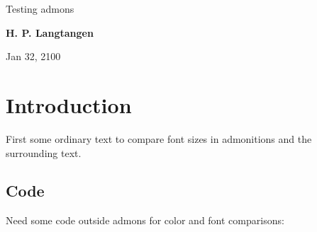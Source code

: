 \documentclass[%
oneside,                 %
final,                   %
10pt]{article}
\begin{document}

\newcommand{\exercisesection}[1]{\subsection*{#1}}








\thispagestyle{empty}

\begin{center}
{\LARGE\bf
\begin{spacing}{1.25}
Testing admons
\end{spacing}
}
\end{center}


\begin{center}
{\bf H. P. Langtangen${}^{}$} \\ [0mm]
\end{center}

\begin{center}
\end{center}
    

\begin{center}
Jan 32, 2100
\end{center}

\vspace{1cm}


\section{Introduction}
First some ordinary text to compare font sizes in admonitions
and the surrounding text.

\subsection{Code}

Need some code outside admons for color and font comparisons:
\end{document}
